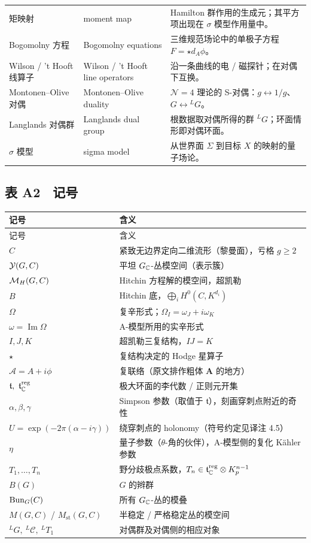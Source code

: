 \begin{longtable}{p{}p{}p{}}
矩映射 & moment map & Hamilton 群作用的生成元；其平方项出现在 $\sigma$ 模型作用量中。 \\
Bogomolny 方程 & Bogomolny equations & 三维规范场论中的单极子方程 $F=\star d_{A}\phi$。 \\
Wilson / 't Hooft 线算子 & Wilson / 't Hooft line operators & 沿一条曲线的电 / 磁探针；在对偶下互换。 \\
Montonen–Olive 对偶 & Montonen–Olive duality & $\mathcal{N}=4$ 理论的 S-对偶：$g\leftrightarrow1/g$、$G\leftrightarrow{}^{L}G$。 \\
Langlands 对偶群 & Langlands dual group & 根数据取对偶所得的群 ${}^{L}G$；环面情形即对偶环面。 \\
$\sigma$ 模型 & sigma model & 从世界面 $\Sigma$ 到目标 $X$ 的映射的量子场论。 \\
\end{longtable}

\subsection*{表 A2　记号}

\begin{longtable}{p{}p{}}
\toprule 记号 & 含义 \\ \midrule \endfirsthead
\toprule 记号 & 含义 \\ \midrule \endhead
\bottomrule \endfoot
$C$ & 紧致无边界定向二维流形（黎曼面），亏格 $g\ge2$ \\
$\mathcal{Y}(G,C)$ & 平坦 $G_{\mathbb{C}}$-丛模空间（表示簇） \\
$\mathcal{M}_{H}(G,C)$ & Hitchin 方程解的模空间，超凯勒 \\
$B$ & Hitchin 底，$\bigoplus_{i}H^{0}(C,K^{d_{i}})$ \\
$\Omega$ & 复辛形式；$\Omega_{I}=\omega_{J}+i\omega_{K}$ \\
$\omega=\operatorname{Im}\Omega$ & A-模型所用的实辛形式 \\
$I,J,K$ & 超凯勒三复结构，$IJ=K$ \\
$\star$ & 复结构决定的 Hodge 星算子 \\
$\mathcal{A}=A+i\phi$ & 复联络（原文排作粗体 $\bm{A}$ 的地方） \\
$\mathfrak{t},\ \mathfrak{t}_{\C}^{\mathrm{reg}}$ & 极大环面的李代数 / 正则元开集 \\
$\alpha,\beta,\gamma$ & Simpson 参数（取值于 $\mathfrak{t}$），刻画穿刺点附近的奇性 \\
$U=\exp(-2\pi(\alpha-i\gamma))$ & 绕穿刺点的 holonomy（符号约定见译注 4.5） \\
$\eta$ & 量子参数（$\theta$-角的伙伴），A-模型侧的复化 Kähler 参数 \\
$T_{1},\dots,T_{n}$ & 野分歧极点系数，$T_{n}\in\mathfrak{t}_{\mathbb{C}}^{\mathrm{reg}}\otimes K_{p}^{n-1}$ \\
$B(G)$ & $G$ 的辫群 \\
$\mathrm{Bun}_{G}(C)$ & 所有 $G_{\mathbb{C}}$-丛的模叠 \\
$M(G,C)$ / $M_{\mathrm{st}}(G,C)$ & 半稳定 / 严格稳定丛的模空间 \\
${}^{L}G,\ {}^{L}\mathcal{C},\ {}^{L}T_{1}$ & 对偶群及对偶侧的相应对象 \\
\end{longtable}
